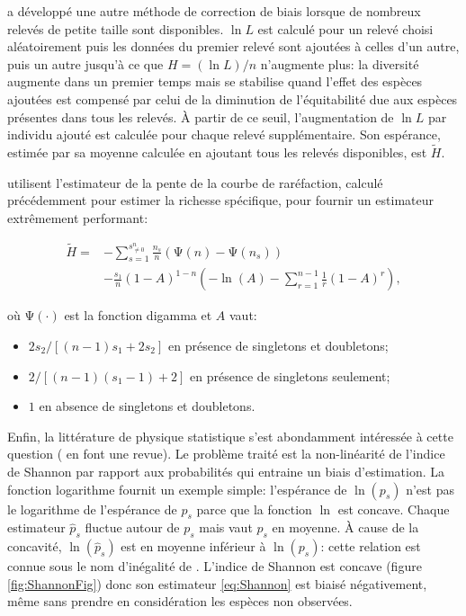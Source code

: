 \documentclass[
  11pt,
  french,
  a4paper,
  extrafontsizes,onecolumn,openright
  ]{memoir}
\providecommand{\tightlist}{%
  \setlength{\itemsep}{0pt}\setlength{\parskip}{0pt}}
\begin{document}
\textcite{Pielou1966} a développé une autre méthode de correction de biais lorsque de nombreux relevés de petite taille sont disponibles.
\(\ln{L}\) est calculé pour un relevé choisi aléatoirement puis les données du premier relevé sont ajoutées à celles d'un autre, puis un autre jusqu'à ce que \(H=(\ln{L})/{n}\) n'augmente plus: la diversité augmente dans un premier temps mais se stabilise quand l'effet des espèces ajoutées est compensé par celui de la diminution de l'équitabilité due aux espèces présentes dans tous les relevés.
À partir de ce seuil, l'augmentation de \(\ln{L}\) par individu ajouté est calculée pour chaque relevé supplémentaire.
Son espérance, estimée par sa moyenne calculée en ajoutant tous les relevés disponibles, est \(\tilde{H}\).

\textcite{Chao2013} utilisent l'estimateur de la pente de la courbe de raréfaction, calculé précédemment \autocite{Chao2012b} pour estimer la richesse spécifique, pour fournir un estimateur extrêmement performant:

\begin{align}
  \label{eq:Chao2013}
  \tilde{H}
  = &-\sum_{s=1}^{s^{n}_{\ne 0}}
    {\frac{n_s}{n}\left(\mathrm{\Psi}\left(n\right) - \mathrm{\Psi}\left(n_s\right)\right)} \\
  &-\frac{s_{1}}{n} {\left(1-A\right)}^{1-n} \left(-{\ln\left( A \right)}-\sum^{n-1}_{r=1}{\frac{1}{r}{\left( 1-A \right)}^r}\right),
\end{align}

où \(\mathrm{\Psi}\left(\cdot\right)\) est la fonction digamma et \(A\) vaut:

\begin{itemize}
\tightlist
\item
  \(2s_{2}/{\left[\left(n-1\right) s_{1} +2s_{2}\right]}\) en présence de singletons et doubletons;
\item
  \(2/{\left[\left(n-1\right)\left(s_{1} -1\right)+2\right]}\) en présence de singletons seulement;
\item
  \(1\) en absence de singletons et doubletons.
\end{itemize}

Enfin, la littérature de physique statistique s'est abondamment intéressée à cette question (\textcite{Bonachela2008} en font une revue).
Le problème traité est la non-linéarité de l'indice de Shannon par rapport aux probabilités qui entraine un biais d'estimation.
La fonction logarithme fournit un exemple simple: l'espérance de \(\ln(p_s)\) n'est pas le logarithme de l'espérance de \(p_s\) parce que la fonction \(\ln\) est concave.
Chaque estimateur \({\hat{p}}_s\) fluctue autour de \(p_s\) mais vaut \(p_s\) en moyenne.
À cause de la concavité, \(\ln({\hat{p}}_s)\) est en moyenne inférieur à \(\ln(p_s)\): cette relation est connue sous le nom d'inégalité de \textcite{Jensen1906}.
L'indice de Shannon est concave (figure \ref{fig:ShannonFig}) donc son estimateur \eqref{eq:Shannon} est biaisé négativement, même sans prendre en considération les espèces non observées.
\end{document}
